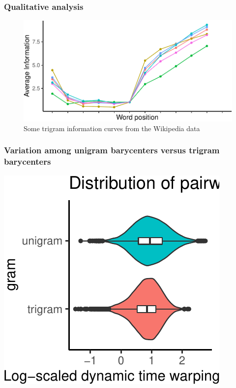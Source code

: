 \documentclass[man,floatsintext]{apa6}
\begin{document}
\hypertarget{qualitative-analysis}{%
\subsubsection{Qualitative analysis}\label{qualitative-analysis}}

\begin{figure}
\centering
\includegraphics{figs/wiki-trigrams-1.pdf}
\caption{\label{fig:wiki-trigrams}Some trigram information curves from the Wikipedia data}
\end{figure}

\hypertarget{variation-among-unigram-barycenters-versus-trigram-barycenters}{%
\subsubsection{Variation among unigram barycenters versus trigram barycenters}\label{variation-among-unigram-barycenters-versus-trigram-barycenters}}

\includegraphics{figs/plot-1.pdf}
\end{document}
